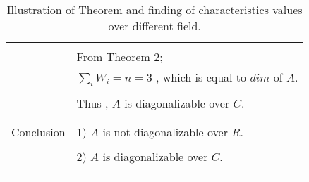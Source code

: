 \documentclass[journal,12pt]{IEEEtran}
\begin{document}
\begin{longtable}{|l|l|}
&\\
& From Theorem 2;\\
& $\sum_{i} W_i = n = 3$ , which is equal to $dim$ of $A$.\\
&\\
& Thus , $A$ is diagonalizable over $C$.\\
&\\
\hline
\multirow{3}{*}{Conclusion} & \\
& 1) $A$ is not diagonalizable over $R$. \\
&\\
& 2) $A$ is diagonalizable over $C$.\\
&\\
\hline
\caption{Illustration of Theorem and finding of characteristics values over different field.}
\label{table:1}
\end{longtable}
\end{document}

